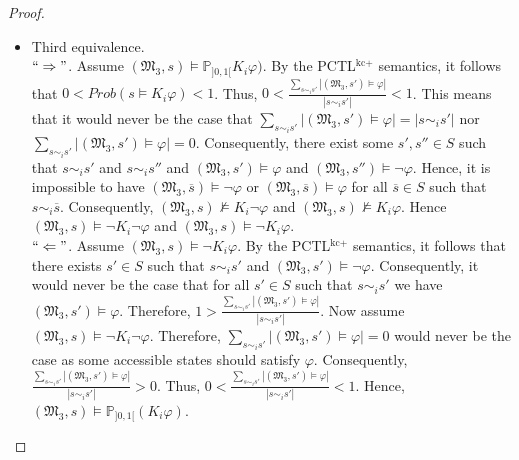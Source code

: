 \begin{proof}
\begin{itemize}
\item Third equivalence. ~\\
    $``\Rightarrow"$. Assume $(\mathfrak{M_3},s)\models \mathbb{P}_{]0,1[} K_i\varphi)$. By the PCTL$^{\textrm{kc+}}$ semantics, it follows that $0< Prob(s\models K_i\varphi)<1$. Thus, $0<\frac{\sum_{s\sim_i s'}|(\mathfrak{M_3},s')\models \varphi| }{|s \sim_i s'|}<1$.
    This means that it would never be the case that $\sum_{s\sim_i s'}|(\mathfrak{M_3},s')\models \varphi| = |s\sim_i s'|$ nor $\sum_{s\sim_i s'}|(\mathfrak{M_3},s')\models \varphi| = 0$. Consequently, there exist some $s', s'' \in S$ such that $s\sim_i s'$ and $s\sim_i s''$ and $(\mathfrak{M_3},s')\models \varphi$ and $(\mathfrak{M_3},s'')\models \neg \varphi$. Hence, it is impossible to have $(\mathfrak{M_3},\overline{s})\models \neg\varphi$ or $(\mathfrak{M_3},\overline{s})\models \varphi$ for all $\overline{s}\in S$ such that $s\sim_i \overline{s}$. Consequently, $(\mathfrak{M_3},s)\nvDash K_i\neg\varphi$ and $(\mathfrak{M_3},s)\nvDash K_i\varphi$. Hence $(\mathfrak{M_3},s)\models \neg K_i\neg\varphi$ and $(\mathfrak{M_3},s)\models \neg K_i\varphi$. ~\\
    $``\Leftarrow"$. Assume $(\mathfrak{M_3},s)\models \neg K_i\varphi$. By the PCTL$^{\textrm{kc+}}$ semantics, it follows that there exists $s'\in S$ such that $s\sim_i s'$ and $(\mathfrak{M_3},s')\models \neg \varphi$. Consequently, it would never be the case that for all $s'\in S$ such that $s\sim_i s'$ we have $(\mathfrak{M_3},s')\models \varphi$. Therefore, $1>\frac{\sum_{s\sim_i s'}|(\mathfrak{M_3},s')\models \varphi| }{|s\sim_i s'|}$. Now assume $(\mathfrak{M_3},s)\models \neg K_i\neg \varphi$. Therefore, $\sum_{s\sim_i s'}|(\mathfrak{M_3},s')\models \varphi| = 0$ would never be the case as some accessible states should satisfy $\varphi$. Consequently, $\frac{\sum_{s\sim_i s'}|(\mathfrak{M_3},s')\models \varphi| }{|s\sim_i s'|}>0$. Thus, $0<\frac{\sum_{s\sim_i s'}|(\mathfrak{M_3},s')\models \varphi| }{|s \sim_i s'|}<1$. Hence, $(\mathfrak{M_3},s)\models \mathbb{P}_{]0,1[} (K_i\varphi)$.
\end{itemize}
\end{proof}



